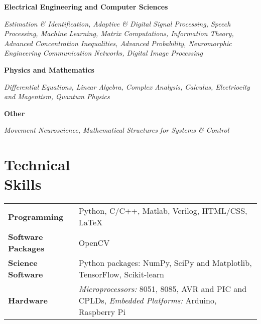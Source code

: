 \documentclass[margin,line]{res}
\newenvironment{list1}{
  \begin{list}{\ding{113}}{%
      \setlength{\itemsep}{0in}
      \setlength{\parsep}{0in} \setlength{\parskip}{0in}
      \setlength{\topsep}{0in} \setlength{\partopsep}{0in} 
      \setlength{\leftmargin}{0.17in}}}{\end{list}}
\begin{document}
\begin{resume}
\begin{list1}
\item[\strut\hspace{0.5cm}\hypertarget{crselst}{\textbf{Electrical Engineering and Computer Sciences}}]
\item[]\textit{Estimation \& Identification, Adaptive \& Digital Signal Processing, Speech Processing, Machine Learning, Matrix Computations, Information Theory, Advanced Concentration Inequalities, Advanced Probability, Neuromorphic Engineering Communication Networks, Digital Image Processing}
\vspace{0.05in}
\item[\strut\hspace{0.5cm}\textbf{Physics and Mathematics}]
\vspace{0.05in}
\item[]\textit{Differential Equations, Linear Algebra, Complex Analysis, Calculus, Electriocity and Magentism, Quantum Physics}
\item[\strut\hspace{0.5cm}\textbf{Other}]
\vspace{0.05in}
\item[]\textit{Movement Neuroscience, Mathematical Structures for Systems \& Control}

\end{list1}

\section{\sc Technical \\Skills} 
\begin{tabular}{@{}p{1.3in}p{4.3in}}
\textbf{Programming} & Python, C/C++, Matlab, Verilog, HTML/CSS, \LaTeX \\  
\vspace*{-0.06in}
\textbf{Software Packages} & 
\vspace*{-0.06in} OpenCV \\ 
\vspace*{-0.06in}
\textbf{Science Software} &
\vspace*{-0.06in}
Python packages: NumPy, SciPy and Matplotlib, TensorFlow, Scikit-learn \\
\vspace*{-0.06in}
\textbf{Hardware} &
\vspace*{-0.06in}
\textit{Microprocessors:} 8051, 8085, AVR and PIC and CPLDs, \textit{Embedded Platforms:} Arduino, Raspberry Pi \\     
\end{tabular}


\end{resume}
\end{document}
